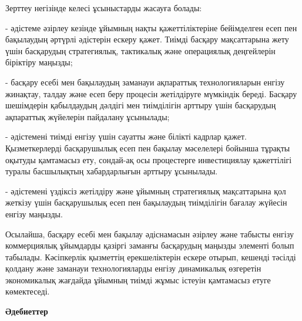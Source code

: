 \begin{multicols}{2}
Зерттеу негізінде келесі ұсыныстарды жасауға болады:

- әдістеме әзірлеу кезінде ұйымның нақты қажеттіліктеріне бейімделген
есеп пен бақылаудың әртүрлі әдістерін ескеру қажет. Тиімді басқару
мақсаттарына жету үшін басқарудың стратегиялық, тактикалық және
операциялық деңгейлерін біріктіру маңызды;

- басқару есебі мен бақылаудың заманауи ақпараттық технологияларын
енгізу жинақтау, талдау және есеп беру процесін жетілдіруге мүмкіндік
береді. Басқару шешімдерін қабылдаудың дәлдігі мен тиімділігін арттыру
үшін басқарудың ақпараттық жүйелерін пайдалану ұсынылады;

- әдістемені тиімді енгізу үшін сауатты және білікті кадрлар қажет.
Қызметкерлерді басқарушылық есеп пен бақылау мәселелері бойынша тұрақты
оқытуды қамтамасыз ету, сондай-ақ осы процестерге инвестициялау
қажеттілігі туралы басшылықтың хабардарлығын арттыру ұсынылады.

- әдістемені үздіксіз жетілдіру және ұйымның стратегиялық мақсаттарына
қол жеткізу үшін басқарушылық есеп пен бақылаудың тиімділігін бағалау
жүйесін енгізу маңызды.

Осылайша, басқару есебі мен бақылау әдіснамасын әзірлеу және табысты
енгізу коммерциялық ұйымдарды қазіргі заманғы басқарудың маңызды
элементі болып табылады. Кәсіпкерлік қызметтің ерекшеліктерін ескере
отырып, кешенді тәсілді қолдану және заманауи технологияларды енгізу
динамикалық өзгеретін экономикалық жағдайда ұйымның тиімді жұмыс істеуін
қамтамасыз етуге көмектеседі.
\end{multicols}

\begin{center}
	{\bfseries Әдебиеттер}
	\end{center}
	
